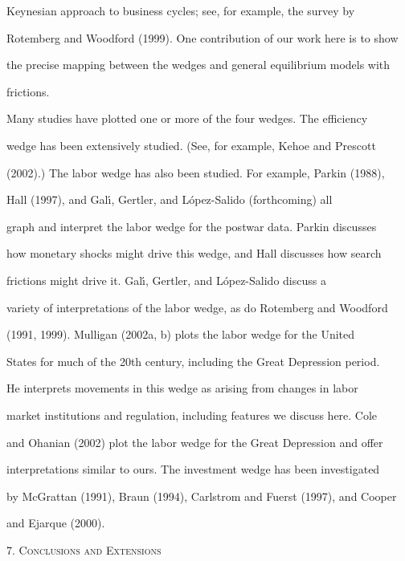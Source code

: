 \documentclass[fleqn,leqno,11pt]{article}
\begin{document}
Keynesian approach to business cycles; see, for example, the survey by

Rotemberg and Woodford (1999). One contribution of our work here is to show

the precise mapping between the wedges and general equilibrium models with

frictions.



Many studies have plotted one or more of the four wedges. The efficiency

wedge has been extensively studied. (See, for example, Kehoe and Prescott

(2002).) The labor wedge has also been studied. For example, Parkin (1988),

Hall (1997), and Gal\'{\i}, Gertler, and L\'{o}pez-Salido (forthcoming) all

graph and interpret the labor wedge for the postwar data. Parkin discusses

how monetary shocks might drive this wedge, and Hall discusses how search

frictions might drive it. Gal\'{\i}, Gertler, and L\'{o}pez-Salido discuss a

variety of interpretations of the labor wedge, as do Rotemberg and Woodford

(1991, 1999). Mulligan (2002a, b) plots the labor wedge for the United

States for much of the 20th century, including the Great Depression period.

He interprets movements in this wedge as arising from changes in labor

market institutions and regulation, including features we discuss here. Cole

and Ohanian (2002) plot the labor wedge for the Great Depression and offer

interpretations similar to ours. The investment wedge has been investigated

by McGrattan (1991), Braun (1994), Carlstrom and Fuerst (1997), and Cooper

and Ejarque (2000).



\bigskip



\begin{center}

7. \textsc{Conclusions and Extensions}

\end{center}
\end{document}
